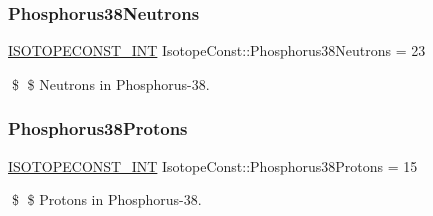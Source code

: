 \subsubsection{\texorpdfstring{Phosphorus38\+Neutrons}{Phosphorus38Neutrons}}
{\footnotesize\ttfamily \mbox{\hyperlink{group___isotope_const-_macros_ga5f18360b3e99483a35c32d789e62621c}{I\+S\+O\+T\+O\+P\+E\+C\+O\+N\+S\+T\+\_\+\+I\+NT}} Isotope\+Const\+::\+Phosphorus38\+Neutrons = 23}

\$ \$ Neutrons in Phosphorus-\/38. \mbox{\label{group___isotope_const-_phosphorus-_p38_ga1aeb45334dcda9440c033d7d20a54372}} 
\subsubsection{\texorpdfstring{Phosphorus38\+Protons}{Phosphorus38Protons}}
{\footnotesize\ttfamily \mbox{\hyperlink{group___isotope_const-_macros_ga5f18360b3e99483a35c32d789e62621c}{I\+S\+O\+T\+O\+P\+E\+C\+O\+N\+S\+T\+\_\+\+I\+NT}} Isotope\+Const\+::\+Phosphorus38\+Protons = 15}

\$ \$ Protons in Phosphorus-\/38. 